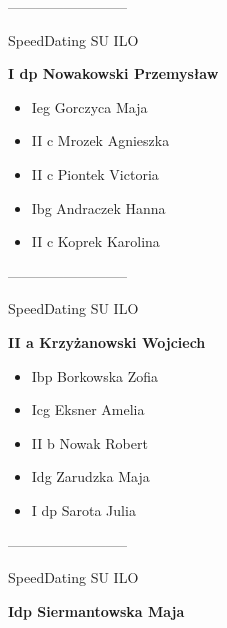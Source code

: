 \documentclass[a4paper,10pt]{article}
\begin{document}
\begin{multicols}{3}
\begin{minipage}[l]{\textwidth}
\begin{itemize}
    \end{itemize}



\end{minipage}



\begin{minipage}[l]{\textwidth}
--------------------------

  \footnotesize{SpeedDating SU ILO}

  \bfseries{I dp Nowakowski Przemysław}

  \begin{itemize}
    \item Ieg Gorczyca Maja
    \item II c Mrozek Agnieszka
    \item II c Piontek Victoria
    \item Ibg Andraczek Hanna
    \item II c Koprek Karolina

    \end{itemize}



\end{minipage}



\begin{minipage}[l]{\textwidth}
--------------------------

  \footnotesize{SpeedDating SU ILO}

  \bfseries{II a Krzyżanowski Wojciech}

  \begin{itemize}
    \item Ibp Borkowska Zofia
    \item Icg Eksner Amelia
    \item II b Nowak Robert
    \item Idg Zarudzka Maja
    \item I dp Sarota Julia

    \end{itemize}



\end{minipage}



\begin{minipage}[l]{\textwidth}
--------------------------

  \footnotesize{SpeedDating SU ILO}

  \bfseries{Idp Siermantowska Maja}


\end{minipage}
\end{multicols}
\end{document}
